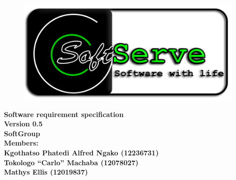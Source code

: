 \documentclass[12pt]{article}
\newcommand{\Title}{Software requirement specification} %
\newcommand{\ssr}{Soft\color{green}{Serve }\color{black}}
\begin{document}
\vspace{4em}

\begin{center}%

\begin{figure}[ht!]
\centering
\includegraphics{./Pictures/logo.png}
\end{figure}
\LARGE \bf \Title \\
{\bf Version 0.5}\\[4em]
\LARGE {\bf \ssr Group }\\[1em]
\LARGE {\bf Members:}\\[2em]
\large
Kgothatso Phatedi Alfred Ngako (12236731) \\[1em]
Tokologo “Carlo” Machaba (12078027) \\[1em]
Mathys Ellis (12019837) \\[8em]

\end{center}%

\end{document}

